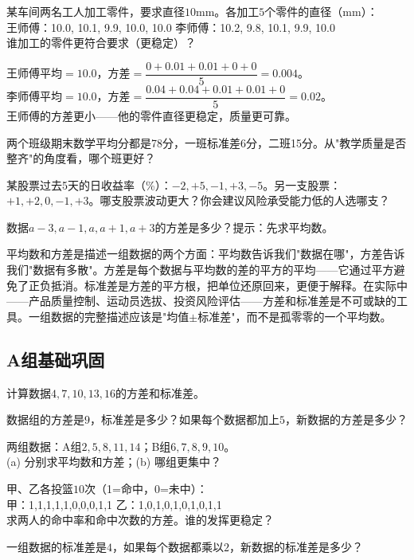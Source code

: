 \begin{example}
某车间两名工人加工零件，要求直径$10$mm。各加工$5$个零件的直径（mm）：\\
王师傅：10.0, 10.1, 9.9, 10.0, 10.0 \qquad 李师傅：10.2, 9.8, 10.1, 9.9, 10.0\\
谁加工的零件更符合要求（更稳定）？
\end{example}
\begin{solution}
王师傅平均$=10.0$，方差$=\dfrac{0+0.01+0.01+0+0}{5}=0.004$。\\
李师傅平均$=10.0$，方差$=\dfrac{0.04+0.04+0.01+0.01+0}{5}=0.02$。\\
王师傅的方差更小——他的零件直径更稳定，质量更可靠。
\end{solution}

\begin{exercise}
\item 两个班级期末数学平均分都是78分，一班标准差6分，二班15分。从"教学质量是否整齐"的角度看，哪个班更好？
\item 某股票过去5天的日收益率（\%）：$-2, +5, -1, +3, -5$。另一支股票：$+1, +2, 0, -1, +3$。哪支股票波动更大？你会建议风险承受能力低的人选哪支？
\item 数据$a-3,a-1,a,a+1,a+3$的方差是多少？提示：先求平均数。
\end{exercise}


平均数和方差是描述一组数据的两个方面：平均数告诉我们"数据在哪"，方差告诉我们"数据有多散"。方差是每个数据与平均数的差的平方的平均——它通过平方避免了正负抵消。标准差是方差的平方根，把单位还原回来，更便于解释。在实际中——产品质量控制、运动员选拔、投资风险评估——方差和标准差是不可或缺的工具。一组数据的完整描述应该是"均值$\pm$标准差"，而不是孤零零的一个平均数。


\subsection*{A组\quad 基础巩固}

\begin{exercise}
\item 计算数据$4,7,10,13,16$的方差和标准差。
\item 数据组的方差是$9$，标准差是多少？如果每个数据都加上$5$，新数据的方差是多少？
\item 两组数据：A组$2,5,8,11,14$；B组$6,7,8,9,10$。\\
(a) 分别求平均数和方差；(b) 哪组更集中？
\item 甲、乙各投篮$10$次（1=命中，0=未中）：\\
甲：1,1,1,1,1,0,0,0,1,1 \qquad 乙：1,0,1,0,1,0,1,0,1,1\\
求两人的命中率和命中次数的方差。谁的发挥更稳定？
\item 一组数据的标准差是$4$，如果每个数据都乘以$2$，新数据的标准差是多少？
\end{exercise}


